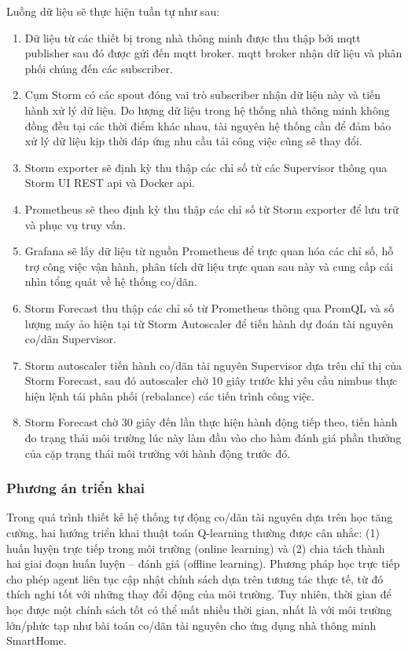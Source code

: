 Luồng dữ liệu sẽ thực hiện tuần tự như sau:

\begin{enumerate}
    \item Dữ liệu từ các thiết bị trong nhà thông minh được thu thập bởi \acrshort{mqtt} publisher sau đó được gửi đến \acrshort{mqtt} broker. \acrshort{mqtt} broker nhận dữ liệu và phân phối chúng đến các subscriber.
    \item Cụm Storm có các spout đóng vai trò subscriber nhận dữ liệu này và tiến hành xử lý dữ liệu. Do lượng dữ liệu trong hệ thống nhà thông minh không đồng đều tại các thời điểm khác nhau, tài nguyên hệ thống cần để đảm bảo xử lý dữ liệu kịp thời đáp ứng nhu cầu tải công việc cũng sẽ thay đổi.
    \item Storm exporter sẽ định kỳ thu thập các chỉ số từ các Supervisor thông qua Storm UI REST \gls{api} và Docker \gls{api}.
    \item Prometheus sẽ theo định kỳ thu thập các chỉ số từ Storm exporter để lưu trữ và phục vụ truy vấn.
    \item Grafana sẽ lấy dữ liệu từ nguồn Prometheus để trực quan hóa các chỉ số, hỗ trợ công việc vận hành, phân tích dữ liệu trực quan sau này và cung cấp cái nhìn tổng quát về hệ thống co/dãn.
    \item Storm Forecast thu thập các chỉ số từ Prometheus thông qua PromQL và số lượng máy ảo hiện tại từ Storm Autoscaler để tiến hành dự đoán tài nguyên co/dãn Supervisor.
    \item Storm autoscaler tiến hành co/dãn tài nguyên Supervisor dựa trên chỉ thị của Storm Forecast, sau đó autoscaler chờ 10 giây trước khi yêu cầu nimbus thực hiện lệnh tái phân phối (rebalance) các tiến trình công việc.
    \item Storm Forecast chờ 30 giây đến lần thực hiện hành động tiếp theo, tiến hành đo trạng thái môi trường lúc này làm đầu vào cho hàm đánh giá phần thưởng của cặp trạng thái môi trường với hành động trước đó.
\end{enumerate}

\subsubsection{Phương án triển khai}

Trong quá trình thiết kế hệ thống tự động co/dãn tài nguyên dựa trên học tăng cường, hai hướng triển khai thuật toán Q-learning thường được cân nhắc: (1) huấn luyện trực tiếp trong môi trường (online learning) và (2) chia tách thành hai giai đoạn huấn luyện – đánh giá (offline learning). Phương pháp học trực tiếp cho phép agent liên tục cập nhật chính sách dựa trên tương tác thực tế, từ đó thích nghi tốt với những thay đổi động của môi trường. Tuy nhiên, thời gian để học được một chính sách tốt có thể mất nhiều thời gian, nhất là với môi trường lớn/phức tạp như bài toán co/dãn tài nguyên cho ứng dụng nhà thông minh SmartHome.

